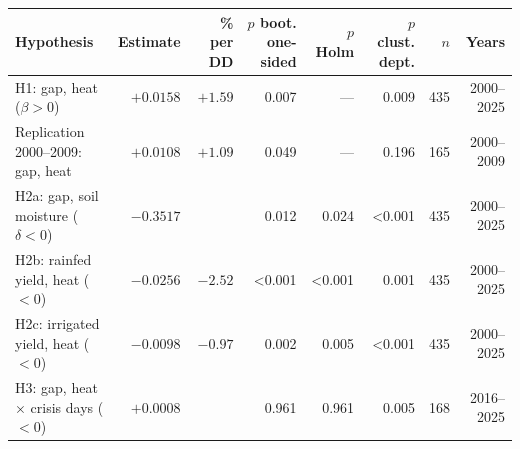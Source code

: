 \begin{tabular}{>{\raggedright}p{4.6cm}rrrrrrr}
\toprule
Hypothesis & Estimate & \% per DD & \shortstack{$p$ boot.\\one-sided} & \shortstack{$p$\\Holm} & \shortstack{$p$ clust.\\dept.} & $n$ & Years \\
\midrule
H1: gap, heat ($\beta > 0$) & $+0.0158$ & $+1.59$ & 0.007 & --- & 0.009 & 435 & 2000--2025 \\
Replication 2000--2009: gap, heat & $+0.0108$ & $+1.09$ & 0.049 & --- & 0.196 & 165 & 2000--2009 \\
H2a: gap, soil moisture ($\delta < 0$) & $-0.3517$ &  & 0.012 & 0.024 & <0.001 & 435 & 2000--2025 \\
H2b: rainfed yield, heat ($< 0$) & $-0.0256$ & $-2.52$ & <0.001 & <0.001 & 0.001 & 435 & 2000--2025 \\
H2c: irrigated yield, heat ($< 0$) & $-0.0098$ & $-0.97$ & 0.002 & 0.005 & <0.001 & 435 & 2000--2025 \\
H3: gap, heat $\times$ crisis days ($< 0$) & $+0.0008$ &  & 0.961 & 0.961 & 0.005 & 168 & 2016--2025 \\
\bottomrule
\end{tabular}
